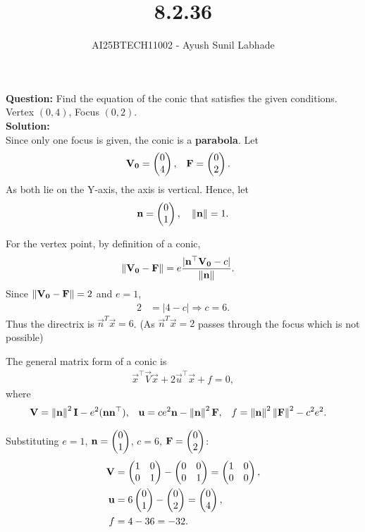 \documentclass{beamer}
\begin{document}
\title{8.2.36}
\author{AI25BTECH11002 - Ayush Sunil Labhade}
{\let\newpage\relax\maketitle}

\textbf{Question:} Find the equation of the conic that satisfies the given conditions.\\
Vertex $(0,4)$, Focus $(0,2)$.\\

\textbf{Solution:}\\
Since only one focus is given, the conic is a \textbf{parabola}.  
Let
\begin{align}
\mathbf{V_0} &= \begin{pmatrix}0 \\ 4\end{pmatrix}, &
\mathbf{F} &= \begin{pmatrix}0 \\ 2\end{pmatrix}.
\end{align}
As both lie on the Y-axis, the axis is vertical.  
Hence, let
\begin{align}
\mathbf{n} = \begin{pmatrix}0 \\ 1\end{pmatrix}, \quad \left\lVert\mathbf{n}\right\rVert = 1.
\end{align}

For the vertex point, by definition of a conic,
\begin{align}
\left\lVert\mathbf{V_0}-\mathbf{F}\right\rVert &= e \frac{|\mathbf{n}^\top\mathbf{V_0} - c|}{\left\lVert\mathbf{n}\right\rVert}.
\end{align}
Since $\left\lVert\mathbf{V_0}-\mathbf{F}\right\rVert = 2$ and $e=1$,
\begin{align}
2 &= |4 - c| \Rightarrow c = 6.
\end{align}
Thus the directrix is $\vec{n}^T\vec{x} = 6$.\newline
(As $\vec{n}^T\vec{x}=2$ passes through the focus which is not possible)

The general matrix form of a conic is
\begin{align}
\vec{x}^\top\vec{V}\vec{x} + 2\vec{u}^\top\vec{x} + f = 0,
\end{align}
where
\begin{align}
\mathbf{V} &= \left\lVert\mathbf{n}\right\rVert^2\mathbf{I} - e^2(\mathbf{n}\mathbf{n}^\top), &
\mathbf{u} &= ce^2\mathbf{n} - \left\lVert\mathbf{n}\right\rVert^2\mathbf{F}, &
f &= \left\lVert\mathbf{n}\right\rVert^2\left\lVert\mathbf{F}\right\rVert^2 - c^2e^2.
\end{align}

Substituting $e=1$, $\mathbf{n}=\begin{pmatrix}0\\1\end{pmatrix}$, $c=6$, $\mathbf{F}=\begin{pmatrix}0\\2\end{pmatrix}$:
\begin{align}
\mathbf{V} &= \begin{pmatrix}1 & 0 \\ 0 & 1\end{pmatrix} - \begin{pmatrix}0 & 0 \\ 0 & 1\end{pmatrix} = \begin{pmatrix}1 & 0 \\ 0 & 0\end{pmatrix},\\
\mathbf{u} &= 6\begin{pmatrix}0 \\ 1\end{pmatrix} - \begin{pmatrix}0 \\ 2\end{pmatrix} = \begin{pmatrix}0 \\ 4\end{pmatrix},\\
f &= 4 - 36 = -32.
\end{align}
\end{document}
